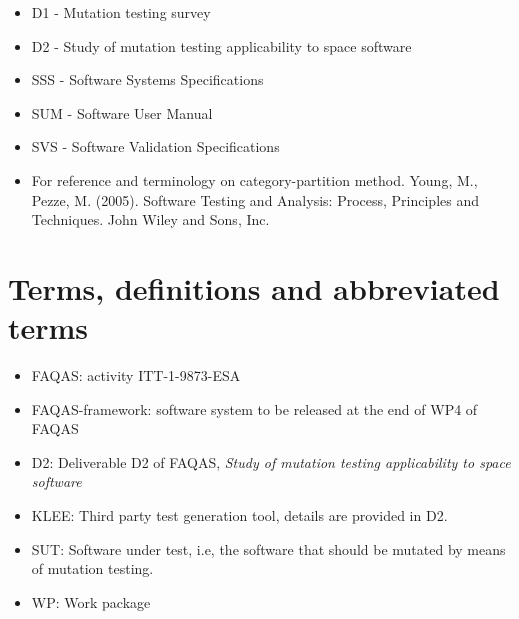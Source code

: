 \begin{itemize}
\item{D1 - Mutation testing survey}
\item{D2 - Study of mutation testing applicability to space software}
\item{SSS - Software Systems Specifications}
\item{SUM - Software User Manual}
\item{SVS - Software Validation Specifications}
\item{For reference and terminology on category-partition method. Young, M., Pezze, M. (2005). Software Testing and Analysis: Process, Principles and Techniques. John Wiley and Sons, Inc.}
\end{itemize}

\chapter{Terms, definitions and abbreviated terms}

\begin{itemize}
\item{FAQAS}: activity ITT-1-9873-ESA
\item{FAQAS-framework}: software system to be released at the end of WP4 of FAQAS
\item{D2}: Deliverable D2 of FAQAS, \emph{Study of mutation testing applicability to space software}
\item{KLEE}: Third party test generation tool, details are provided in D2.
\item{SUT}: Software under test, i.e, the software that should be mutated by means of mutation testing.
\item{WP}: Work package
\end{itemize}

\clearpage

